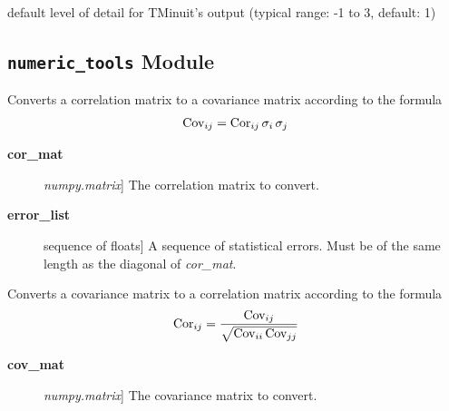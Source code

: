 \documentclass[a4paper,10pt,english]{sphinxmanual}
\begin{document}

\begin{fulllineitems}
\label{index:kafe.minuit.P_DETAIL_LEVEL}
default level of detail for TMinuit's output
(typical range: -1 to 3, default: 1)

\end{fulllineitems}



\subsection{\texttt{numeric\_tools} Module}
\label{index:module-kafe.numeric_tools}\label{index:numeric-tools-module}\label{index:module-numeric_tools}

\begin{fulllineitems}
\label{index:kafe.numeric_tools.cor_to_cov}
Converts a correlation matrix to a covariance matrix according to the
formula
\begin{gather}
\begin{split}\text{Cov}_{ij} = \text{Cor}_{ij}\, \sigma_i \, \sigma_j\end{split}\notag
\end{gather}\begin{description}
\item[{\textbf{cor\_mat}}] \leavevmode{[}\emph{numpy.matrix}{]}
The correlation matrix to convert.

\item[{\textbf{error\_list}}] \leavevmode{[}sequence of floats{]}
A sequence of statistical errors. Must be of the same length
as the diagonal of \emph{cor\_mat}.

\end{description}

\end{fulllineitems}


\begin{fulllineitems}
\label{index:kafe.numeric_tools.cov_to_cor}
Converts a covariance matrix to a correlation matrix according to the
formula
\begin{gather}
\begin{split}\text{Cor}_{ij} = \frac{\text{Cov}_{ij}}
    {\sqrt{ \text{Cov}_{ii}\,\text{Cov}_{jj}}}\end{split}\notag
\end{gather}\begin{description}
\item[{\textbf{cov\_mat}}] \leavevmode{[}\emph{numpy.matrix}{]}
The covariance matrix to convert.

\end{description}

\end{fulllineitems}
\end{document}

